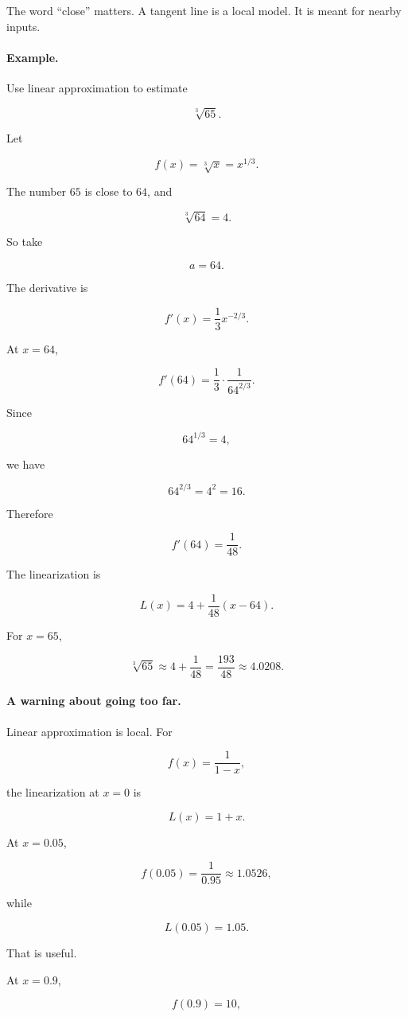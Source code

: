 The word ``close'' matters.  A tangent line is a local model.  It is meant for nearby
inputs.

\paragraph{Example.}
Use linear approximation to estimate

\[
\sqrt[3]{65}.
\]

Let

\[
f(x)=\sqrt[3]{x}=x^{1/3}.
\]

The number \(65\) is close to \(64\), and

\[
\sqrt[3]{64}=4.
\]

So take

\[
a=64.
\]

The derivative is

\[
f'(x)=\frac13x^{-2/3}.
\]

At \(x=64\),

\[
f'(64)=\frac13\cdot\frac{1}{64^{2/3}}.
\]

Since

\[
64^{1/3}=4,
\]

we have

\[
64^{2/3}=4^2=16.
\]

Therefore

\[
f'(64)=\frac{1}{48}.
\]

The linearization is

\[
L(x)=4+\frac{1}{48}(x-64).
\]

For \(x=65\),

\[
\sqrt[3]{65}\approx 4+\frac{1}{48}
=
\frac{193}{48}
\approx 4.0208.
\]

\paragraph{A warning about going too far.}
Linear approximation is local.  For

\[
f(x)=\frac{1}{1-x},
\]

the linearization at \(x=0\) is

\[
L(x)=1+x.
\]

At \(x=0.05\),

\[
f(0.05)=\frac{1}{0.95}\approx 1.0526,
\]

while

\[
L(0.05)=1.05.
\]

That is useful.

At \(x=0.9\),

\[
f(0.9)=10,
\]

